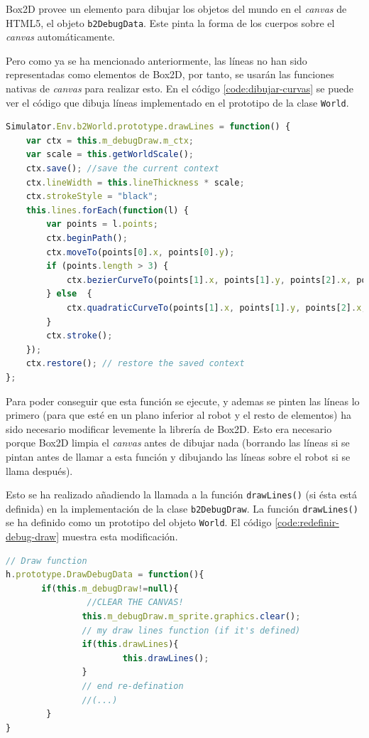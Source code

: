 Box2D provee un elemento para dibujar los objetos del mundo en el \emph{canvas} de HTML5, el objeto \texttt{b2DebugData}. Este pinta la forma de los cuerpos sobre el \emph{canvas} automáticamente. 

Pero como ya se ha mencionado anteriormente, las líneas no han sido representadas como elementos de Box2D, por tanto, se usarán las funciones nativas de \emph{canvas} para realizar esto. En el código \ref{code:dibujar-curvas} se puede ver el código que dibuja líneas implementado en el prototipo de la clase \texttt{World}.

\begin{lstlisting}[language={Javascript},label={code:dibujar-curvas}, caption={Función que dibuja las curvas de bezier en el \emph{canvas}.}]
Simulator.Env.b2World.prototype.drawLines = function() {
	var ctx = this.m_debugDraw.m_ctx;
	var scale = this.getWorldScale();
	ctx.save(); //save the current context
	ctx.lineWidth = this.lineThickness * scale;
	ctx.strokeStyle = "black";
	this.lines.forEach(function(l) {
		var points = l.points;
		ctx.beginPath();
		ctx.moveTo(points[0].x, points[0].y);
		if (points.length > 3) {
			ctx.bezierCurveTo(points[1].x, points[1].y, points[2].x, points[2].y, points[3].x, points[3].y);
		} else  {
			ctx.quadraticCurveTo(points[1].x, points[1].y, points[2].x, points[2].y);
		}
		ctx.stroke();
	});
	ctx.restore(); // restore the saved context
};
\end{lstlisting}

Para poder conseguir que esta función se ejecute, y ademas se pinten las líneas lo primero (para que esté en un plano inferior al robot y el resto de elementos) ha sido necesario modificar levemente la librería de Box2D. Esto era necesario porque Box2D limpia el \emph{canvas} antes de dibujar nada (borrando las líneas si se pintan antes de llamar a esta función y dibujando las líneas sobre el robot si se llama después). 

Esto se ha realizado añadiendo la llamada a la función \texttt{drawLines()} (si ésta está definida) en la implementación de la clase \texttt{b2DebugDraw}. La función \texttt{drawLines()} se ha definido como un prototipo del objeto \texttt{World}. El código \ref{code:redefinir-debug-draw} muestra esta modificación.

\begin{lstlisting}[language={Javascript},label={code:redefinir-debug-draw}, caption={Modificación de la librería de Box2D para poder dibujar de manera correcta las líneas.}]
// Draw function 
h.prototype.DrawDebugData = function(){ 
	   if(this.m_debugDraw!=null){
	   			//CLEAR THE CANVAS!
			   this.m_debugDraw.m_sprite.graphics.clear(); 
			   // my draw lines function (if it's defined)
			   if(this.drawLines){
					   this.drawLines();
			   }
			   // end re-defination
			   //(...)
		}
}
\end{lstlisting}

